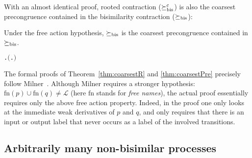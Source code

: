 With an almost identical proof, rooted contraction
($\mathrel{\succeq^{\rm{c}}_{\rm{bis}}}$) is also the coarsest
precongruence contained in the bisimilarity contraction ($\mathrel{\succeq_{\rm{bis}}}$):
\begin{theorem}
  \label{thm:coarsestPre}
  Under the free action hypothesis, $\mathrel{\succeq_{\rm{bis}}}$ is the coarsest precongruence contained in $\mathrel{\succeq_{\rm{bis}}}$.
\begin{alltt}
\HOLTokenTurnstile{} \HOLSymConst{\HOLTokenForall{}} .   \HOLSymConst{\HOLTokenConj{}}   \HOLSymConst{\HOLTokenImp{}} \ensuremath{(}\HOLSymConst{\HOLTokenForall{}}.  \HOLSymConst{\ensuremath{+}}  \HOLSymConst{\HOLTokenContracts{}}  \HOLSymConst{\ensuremath{+}} \ensuremath{)} \HOLSymConst{\HOLTokenImp{}}  \HOLSymConst{\HOLTokenObsContracts} 
\end{alltt}
\end{theorem}

The formal proofs of Theorem~\ref{thm:coarsestR} and
\ref{thm:coarsestPre} precisely follow Milner~\citep[p.~153--154]{Mil89}.
Although Milner requires a stronger hypothesis: $\mathrm{fn}(p) \cup
\mathrm{fn}(q) \neq \mathscr{L}$ (here $\mathrm{fn}$ stands for \emph{free
  names}), the actual proof essentially requires only the above
free action property.
Indeed, in the proof one only looks at the immediate weak
derivatives of $p$ and $q$, and only requires that there is an input
or output label that never occurs as a label of the involved transitions.

\subsection{Arbitrarily many non-bisimilar processes}
\label{ss:arbitrarily}

